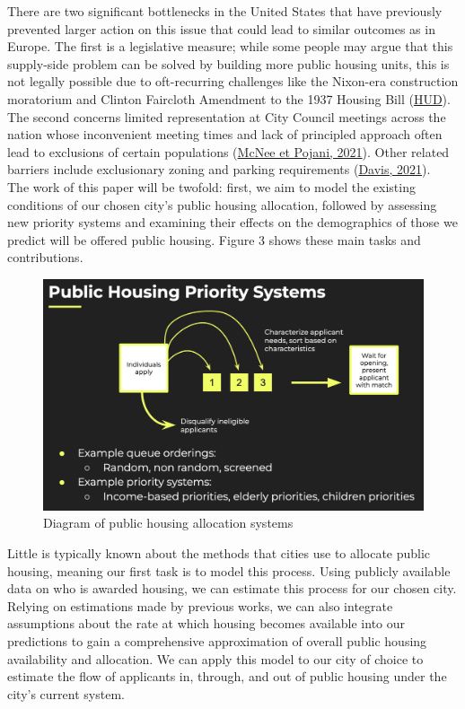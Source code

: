 \documentclass[11pt]{article}
\begin{document}
There are two significant bottlenecks in the United States that have previously prevented larger action on this issue that could lead to similar outcomes as in Europe. The first is a legislative measure; while some people may argue that this supply-side problem can be solved by building more public housing units, this is not legally possible due to oft-recurring challenges like the Nixon-era construction moratorium and Clinton Faircloth Amendment to the 1937 Housing Bill (\href{https://www.hud.gov/sites/documents/FRCLTH-LMT.PDF}{HUD}). The second concerns limited representation at City Council meetings across the nation whose inconvenient meeting times and lack of principled approach often lead to exclusions of certain populations (\href{https://www.ncbi.nlm.nih.gov/pmc/articles/PMC8149917/}{McNee et Pojani, 2021}). Other related barriers include exclusionary zoning and parking requirements (\href{https://www.brookings.edu/articles/the-double-edged-sword-of-upzoning/#:~:text=Cities%20are%20in%20desperate%20need,contributes%20to%20rising%20housing%20costs}{Davis, 2021}).\\
\newline
The work of this paper will be twofold: first, we aim to model the existing conditions of our chosen city's public housing allocation, followed by assessing new priority systems and examining their effects on the demographics of those we predict will be offered public housing. Figure 3 shows these main tasks and contributions.\\
\begin{figure}
    \centering
    \includegraphics[width=0.75\linewidth]{schematic_priority _systems.png}
    \caption{Diagram of public housing allocation systems}
    \label{fig:schematic}
\end{figure}
\newline
Little is typically known about the methods that cities use to allocate public housing, meaning our first task is to model this process. Using publicly available data on who is awarded housing, we can estimate this process for our chosen city. Relying on estimations made by previous works, we can also integrate assumptions about the rate at which housing becomes available into our predictions to gain a comprehensive approximation of overall public housing availability and allocation. We can apply this model to our city of choice to estimate the flow of applicants in, through, and out of public housing under the city's current system. \\
\end{document}
